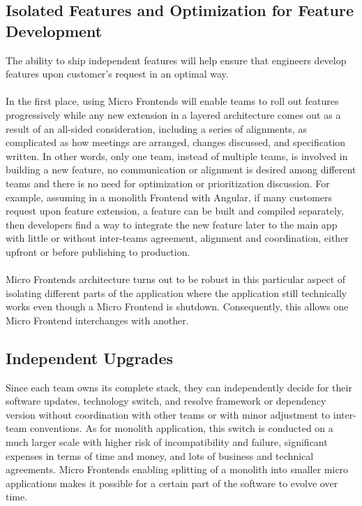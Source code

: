 \documentclass[a4paper]{book}
\begin{document}
\subsection{Isolated Features and Optimization for Feature Development} \label{IsolatedFeatures}

The ability to ship independent features will help ensure that engineers develop features upon customer’s request in an optimal way. 
\\ \\
In the first place, using Micro Frontends will enable teams to roll out features progressively while any new extension in a layered architecture comes out as a result of an all-sided consideration, including a series of alignments, as complicated as how meetings are arranged, changes discussed, and specification written. In other words, only one team, instead of multiple teams, is involved in building a new feature, no communication or alignment is desired among different teams and there is no need for optimization or prioritization discussion. For example, assuming in a monolith Frontend with Angular, if many customers request upon feature extension, a feature can be built and compiled separately, then developers find a way to integrate the new feature later to the main app with little or without inter-teams agreement, alignment and coordination, either upfront or before publishing to production.
\\ \\
Micro Frontends architecture turns out to be robust in this particular aspect of isolating different parts of the application where the application still technically works even though a Micro Frontend is shutdown. Consequently, this allows one Micro Frontend interchanges with another.

\subsection{Independent Upgrades}

Since each team owns its complete stack, they can independently decide for their software updates, technology switch, and resolve framework or dependency version without coordination with other teams or with minor adjustment to inter-team conventions. As for monolith application, this switch is conducted on a much larger scale with higher risk of incompatibility and failure, significant expenses in terms of time and money, and lots of business and technical agreements. Micro Frontends enabling splitting of a monolith into smaller micro applications makes it possible for a certain part of the software to evolve over time.
\end{document}

